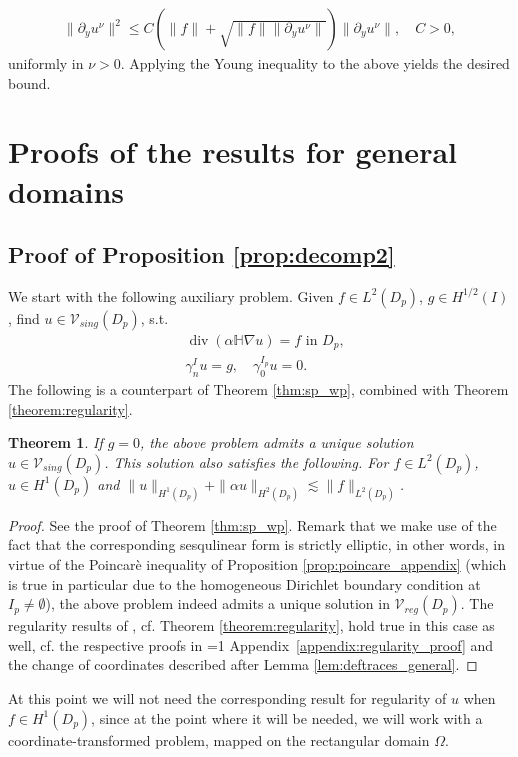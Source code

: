 \documentclass[report]{elsarticle}
\newtheorem{theorem}{Theorem}[section]
\numberwithin{theorem}{section}
\renewcommand{\vec}[1]{\mathbf{#1}}
\newcommand{\isreport}{1}
\newcommand{\citeappendixregularity}{
	\ifnum\isreport=1
	Appendix~\ref{appendix:regularity_proof}
	\else
	\cite[Appendix D]{mk_peillon}
	\fi
}
\begin{document}
\begin{align*}
	\|\partial_y u^{\nu}\|^2\leq C (\|f\|+\sqrt{\|f\|\|\partial_y u^{\nu}\|})\|\partial_y u^{\nu}\|, \quad C>0,
\end{align*}
uniformly in $\nu>0$. 
Applying the Young inequality to the above yields the desired bound.


	
\section{Proofs of the results for general domains}
\label{appendix:proof_general}
\subsection{Proof of Proposition \ref{prop:decomp2}}
We start with the following auxiliary problem. 
Given $f\in L^2(D_p)$, $g\in H^{1/2}(I)$, find $u\in \mathcal{V}_{sing}(D_p)$, s.t. 
\begin{align*}
	&\operatorname{div}(\alpha\mathbb{H}\nabla u)=f \text{ in }D_p,\\
	&\gamma_n^{I}u=g,\quad \gamma_0^{I_p}u=0.
\end{align*}
The following is a counterpart of Theorem \ref{thm:sp_wp}, combined with Theorem \ref{theorem:regularity}.
\begin{theorem}
	\label{theorem:sp_wp_general}
	If $g=0$, the above problem admits a unique solution  $u\in \mathcal{V}_{sing}(D_p)$. This solution also satisfies the following. For $f\in L^2(D_p)$, $u\in H^1(D_p)$ and $\|u\|_{H^1(D_p)}+\|\alpha u\|_{H^2(D_p)}\lesssim \|f\|_{L^2(D_p)}$.
\end{theorem}
\begin{proof}
	See the proof of Theorem \ref{thm:sp_wp}. Remark that we make use of the fact that the corresponding sesqulinear form is strictly elliptic, in other words, in virtue of the Poincar\`e inequality of  Proposition \ref{prop:poincare_appendix} (which is true in particular due to the homogeneous Dirichlet boundary condition at $I_p\neq \emptyset$), the above problem indeed admits a unique solution in $\mathcal{V}_{reg}(D_p)$. The regularity results of \cite{baouendi_goulaouic}, cf. Theorem \ref{theorem:regularity}, hold true in this case as well, cf. the respective proofs in \citeappendixregularity and the change of coordinates described after Lemma \ref{lem:deftraces_general}.
\end{proof}
At this point we will not need the corresponding result for regularity of $u$ when $f\in H^1(D_p)$, since at the point where it will be needed, we will work with a coordinate-transformed problem, mapped on the rectangular domain $\Omega$. 
\end{document}
